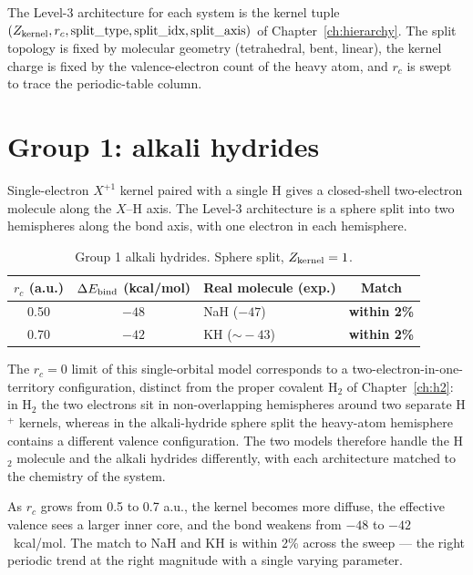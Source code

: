 The Level-3 architecture for each system is the kernel tuple $(Z_{\rm kernel}, r_c, \text{split\_type}, \text{split\_idx}, \text{split\_axis})$ of Chapter~\ref{ch:hierarchy}. The split topology is fixed by molecular geometry (tetrahedral, bent, linear), the kernel charge is fixed by the valence-electron count of the heavy atom, and $r_c$ is swept to trace the periodic-table column.

\section{Group 1: alkali hydrides}\label{sec:group1}

Single-electron $X^{+1}$ kernel paired with a single H gives a closed-shell two-electron molecule along the $X$--H axis. The Level-3 architecture is a sphere split into two hemispheres along the bond axis, with one electron in each hemisphere.

\begin{table}[h]
\centering\small
\caption{Group 1 alkali hydrides. Sphere split, $Z_{\rm kernel} = 1$.}\label{tab:group1}
\begin{tabular}{c c l c}
\toprule
$r_c$ (a.u.) & $\Delta E_{\rm bind}$ (kcal/mol) & Real molecule (exp.) & Match \\
\midrule
0.50 & $-48$ & NaH ($-47$)           & \textbf{within 2\%} \\
0.70 & $-42$ & KH  ($\sim\!-43$)     & \textbf{within 2\%} \\
\bottomrule
\end{tabular}
\end{table}

The $r_c = 0$ limit of this single-orbital model corresponds to a two-electron-in-one-territory configuration, distinct from the proper covalent H$_2$ of Chapter~\ref{ch:h2}: in H$_2$ the two electrons sit in non-overlapping hemispheres around two separate H$^+$ kernels, whereas in the alkali-hydride sphere split the heavy-atom hemisphere contains a different valence configuration. The two models therefore handle the H$_2$ molecule and the alkali hydrides differently, with each architecture matched to the chemistry of the system.

As $r_c$ grows from 0.5 to 0.7 a.u., the kernel becomes more diffuse, the effective valence sees a larger inner core, and the bond weakens from $-48$ to $-42$~kcal/mol. The match to NaH and KH is within 2\% across the sweep --- the right periodic trend at the right magnitude with a single varying parameter.

